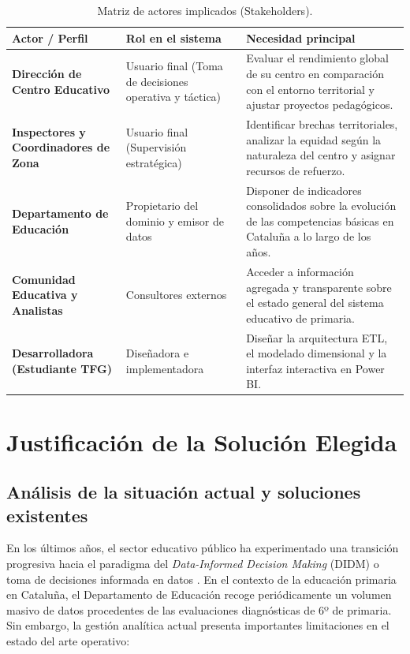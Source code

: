 \documentclass[12pt, a4paper, twoside]{report}
\begin{document}
\begin{table}[h!]
\centering
\caption{Matriz de actores implicados (Stakeholders).}
\label{tab:stakeholders}
\small
\begin{tabularx}{\textwidth}{@{} p{3.8cm} p{4.2cm} X @{}}
\toprule
\textbf{Actor / Perfil} & \textbf{Rol en el sistema} & \textbf{Necesidad principal} \\ \midrule
\textbf{Dirección de Centro Educativo} & Usuario final (Toma de decisiones operativa y táctica) & Evaluar el rendimiento global de su centro en comparación con el entorno territorial y ajustar proyectos pedagógicos. \\ \addlinespace
\textbf{Inspectores y Coordinadores de Zona} & Usuario final (Supervisión estratégica) & Identificar brechas territoriales, analizar la equidad según la naturaleza del centro y asignar recursos de refuerzo. \\ \addlinespace
\textbf{Departamento de Educación} & Propietario del dominio y emisor de datos & Disponer de indicadores consolidados sobre la evolución de las competencias básicas en Cataluña a lo largo de los años. \\ \addlinespace
\textbf{Comunidad Educativa y Analistas} & Consultores externos & Acceder a información agregada y transparente sobre el estado general del sistema educativo de primaria. \\ \addlinespace
\textbf{Desarrolladora (Estudiante TFG)} & Diseñadora e implementadora & Diseñar la arquitectura ETL, el modelado dimensional y la interfaz interactiva en Power BI. \\ \bottomrule
\end{tabularx}
\end{table}



\chapter{Justificación de la Solución Elegida}

\section{Análisis de la situación actual y soluciones existentes}
En los últimos años, el sector educativo público ha experimentado una transición progresiva hacia el paradigma del \textit{Data-Informed Decision Making} (DIDM) o toma de decisiones informada en datos \cite{mandinach2012data}. En el contexto de la educación primaria en Cataluña, el Departamento de Educación recoge periódicamente un volumen masivo de datos procedentes de las evaluaciones diagnósticas de 6º de primaria. Sin embargo, la gestión analítica actual presenta importantes limitaciones en el estado del arte operativo:
\end{document}
